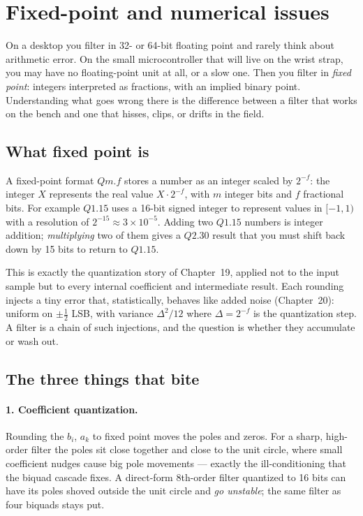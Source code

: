 \section{Fixed-point and numerical issues}
\label{ch17:fixedpoint}

On a desktop you filter in 32- or 64-bit floating point and rarely think about
arithmetic error. On the small microcontroller that will live on the wrist
strap, you may have no floating-point unit at all, or a slow one. Then you filter
in \emph{fixed point}: integers interpreted as fractions, with an implied binary
point. Understanding what goes wrong there is the difference between a filter
that works on the bench and one that hisses, clips, or drifts in the field.

\subsection{What fixed point is}

A fixed-point format $Qm.f$ stores a number as an integer scaled by $2^{-f}$:
the integer $X$ represents the real value $X \cdot 2^{-f}$, with $m$ integer bits
and $f$ fractional bits. For example $Q1.15$ uses a 16-bit signed integer to
represent values in $[-1, 1)$ with a resolution of $2^{-15} \approx 3\times
10^{-5}$. Adding two $Q1.15$ numbers is integer addition; \emph{multiplying}
two of them gives a $Q2.30$ result that you must shift back down by 15 bits to
return to $Q1.15$.

\begin{connectionbox}
This is exactly the quantization story of Chapter~19, applied not to the input
sample but to every internal coefficient and intermediate result. Each rounding
injects a tiny error that, statistically, behaves like added noise (Chapter~20):
uniform on $\pm \tfrac12$ LSB, with variance $\Delta^2/12$ where $\Delta=2^{-f}$
is the quantization step. A filter is a chain of such injections, and the
question is whether they accumulate or wash out.
\end{connectionbox}

\subsection{The three things that bite}

\paragraph{1. Coefficient quantization.} Rounding the $b_i$, $a_k$ to fixed
point moves the poles and zeros. For a sharp, high-order filter the poles sit
close together and close to the unit circle, where small coefficient nudges
cause big pole movements --- exactly the ill-conditioning that the biquad cascade
fixes. A direct-form 8th-order filter quantized to 16 bits can have its poles
shoved outside the unit circle and \emph{go unstable}; the same filter as four
biquads stays put.

